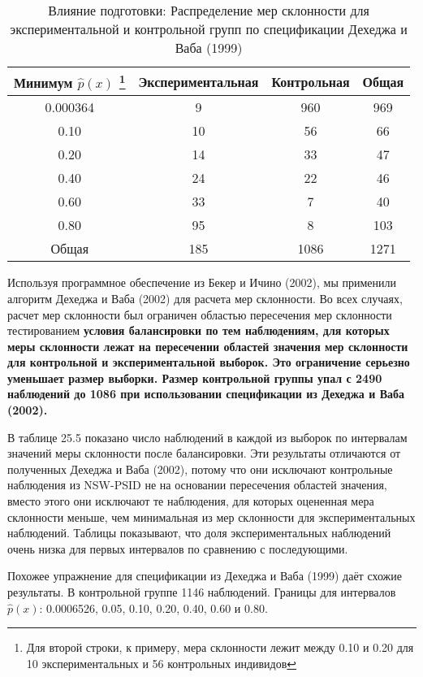 \begin{table}[h]
\caption{Влияние подготовки: Распределение мер склонности для экспериментальной и контрольной групп по спецификации Дехеджа и Ваба (1999)}
\begin{center}
\begin{minipage}{12cm}
\begin{tabular}{cccc}
\hline
\hline
Минимум $\widehat p(x)$ \footnote{Для второй строки, к примеру, мера склонности лежит между 0.10 и 0.20 для 10 экспериментальных и 56 контрольных индивидов} & Экспериментальная & Контрольная &  Общая \\
\hline
0.000364 & 9 & 960 & 969 \\
0.10 & 10 & 56 & 66 \\
0.20 & 14 & 33 & 47 \\
0.40 & 24 & 22 & 46 \\
0.60 & 33 & 7 & 40 \\
0.80 & 95 & 8 & 103 \\
Общая & 185 & 1086 & 1271 \\
\hline
\hline
\end{tabular}
\end{minipage}
\end{center}
\end{table}
Используя программное обеспечение из Бекер и Ичино (2002), мы применили алгоритм Дехеджа и Ваба (2002) для расчета мер склонности. Во всех случаях, расчет мер склонности был ограничен областью пересечения мер склонности тестированием \bfseries условия балансировки \mdseries по тем наблюдениям, для которых меры склонности лежат на пересечении областей значения мер склонности для контрольной и экспериментальной выборок. Это ограничение серьезно уменьшает размер выборки. Размер контрольной группы упал с 2490 наблюдений до 1086 при использовании спецификации из Дехеджа и Ваба (2002). 

В таблице 25.5 показано число наблюдений в каждой из выборок по интервалам значений меры склонности после балансировки. Эти результаты отличаются от полученных Дехеджа и Ваба (2002), потому что они исключают контрольные наблюдения из NSW-PSID не на основании пересечения областей значения, вместо этого они исключают те наблюдения, для которых оцененная мера склонности меньше, чем минимальная из мер склонности для экспериментальных наблюдений. Таблицы показывают, что доля экспериментальных наблюдений очень низка для первых интервалов по сравнению с последующими. 

Похожее упражнение для спецификации из Дехеджа и Ваба (1999) даёт схожие результаты. В контрольной группе 1146 наблюдений. Границы для интервалов $\widehat p(x)$: 0.0006526, 0.05, 0.10, 0.20, 0.40, 0.60 и 0.80. 

